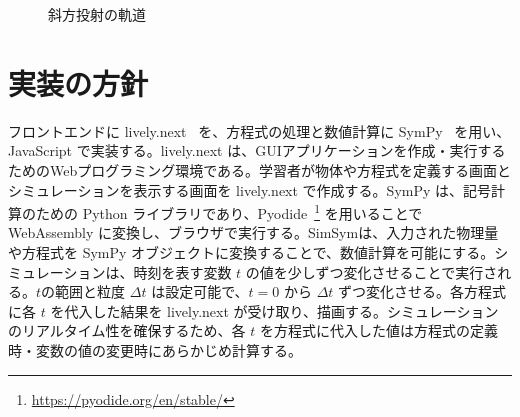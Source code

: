 \documentclass[11pt, a4paper, oneside, twocolumn, dvipdfmx]{jsarticle}
\newcommand{\simname}{SimSym}
\begin{document}
\begin{figure}[htb]
\centering
\begin{minipage}{0.8\linewidth}
\centering
{}
\caption{斜方投射の軌道} \label{correct}
\end{minipage}
\end{figure}

\section{実装の方針} \label{sec3}
フロントエンドに lively.next~\cite{ingalls_2008} を、方程式の処理と数値計算に SymPy~\cite{meurer_sympy_2017} を用い、JavaScript で実装する。lively.next は、GUIアプリケーションを作成・実行するためのWebプログラミング環境である。学習者が物体や方程式を定義する画面とシミュレーションを表示する画面を lively.next で作成する。SymPy は、記号計算のための Python ライブラリであり、Pyodide~\footnote{\url{https://pyodide.org/en/stable/}} を用いることで WebAssembly に変換し、ブラウザで実行する。\simname は、入力された物理量や方程式を SymPy オブジェクトに変換することで、数値計算を可能にする。シミュレーションは、時刻を表す変数 $t$ の値を少しずつ変化させることで実行される。$t$の範囲と粒度 $\Delta t$ は設定可能で、$t=0$ から $\Delta t$ ずつ変化させる。各方程式に各 $t$ を代入した結果を lively.next が受け取り、描画する。シミュレーションのリアルタイム性を確保するため、各 $t$ を方程式に代入した値は方程式の定義時・変数の値の変更時にあらかじめ計算する。
\end{document}
